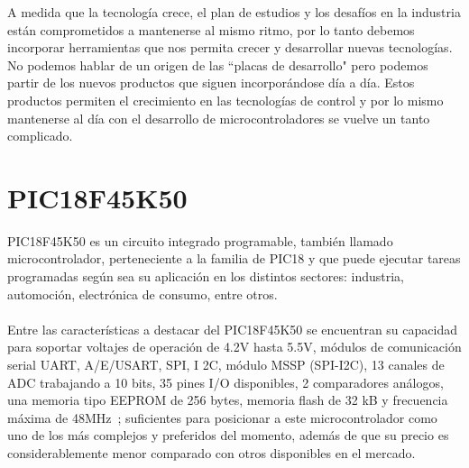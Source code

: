 \documentclass[times, 10pt,twocolumn]{article}
\begin{document}
\raggedbottom
A medida que la tecnología crece, el plan de estudios y los desafíos en la industria están comprometidos a mantenerse al mismo ritmo, por lo tanto debemos incorporar herramientas que nos permita crecer y desarrollar nuevas tecnologías. No podemos hablar de un origen de las ``placas de desarrollo" pero podemos partir de los nuevos productos
que siguen incorporándose día a día. Estos productos permiten el crecimiento en las
tecnologías de control y por lo mismo mantenerse al día con el desarrollo de microcontroladores se vuelve un tanto complicado. 



\section{PIC18F45K50}

PIC18F45K50 es un circuito integrado programable, también llamado microcontrolador, perteneciente a la familia de PIC18 y que puede ejecutar tareas programadas según sea su aplicación en los distintos sectores: industria, automoción, electrónica de consumo, entre otros.\\ \\
Entre las características a destacar del PIC18F45K50 se encuentran su capacidad para soportar voltajes de operación de 4.2V hasta 5.5V, módulos de comunicación serial UART, A/E/USART, SPI, I 2C, módulo MSSP (SPI-I2C), 13 canales de ADC trabajando a 10 bits, 35 pines I/O disponibles, 2 comparadores análogos, una memoria tipo EEPROM de 256 bytes, memoria flash de 32 kB y frecuencia máxima de 48MHz~\cite{ex1}; suficientes para posicionar a este microcontrolador como uno de los más complejos y preferidos del momento, además de que su precio es considerablemente menor comparado con otros disponibles en el mercado.


\end{document}
